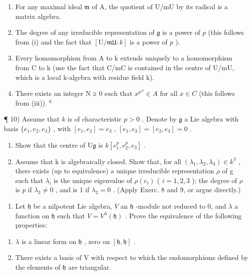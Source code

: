 \begin{enumerate}
\def\labelenumi{(\roman{enumi})}
\item
  For any maximal ideal \(\mathfrak{m}\) of A, the quotient of U/mU by its radical is a matrix algebra.
\item
  The degree of any irreducible representation of \(\mathfrak{g}\) is a power of \(p\) (this follows from (i) and the fact that \([\mathrm{U} / \mathfrak{mU}:k]\) is a power of \(p\) ).
\item
  Every homomorphism from A to k extends uniquely to a homomorphism from C to k (use the fact that C/mC is contained in the centre of U/mU, which is a local k-algebra with residue field k).
\item
  There exists an integer N ≥ 0 such that \(x^{p^{N}} \in A\) for all \(x \in C\) (this follows from (iii)). \(^{6}\)
\end{enumerate}

¶ 10) Assume that \(k\) is of characteristic \(p > 0\) . Denote by \(\mathfrak{g}\) a Lie algebra with basis \(\{e_1, e_2, e_3\}\) , with \([e_1, e_2] = e_3\) , \([e_1, e_3] = [e_2, e_3] = 0\) .

\begin{enumerate}
\def\labelenumi{\alph{enumi})}
\item
  Show that the centre of \(\mathrm{U}\mathfrak{g}\) is \(k[e_1^p,e_2^p,e_3]\) .
\item
  Assume that k is algebraically closed. Show that, for all \((\lambda_{1},\lambda_{2},\lambda_{3})\in k^{3}\) , there exists (up to equivalence) a unique irreducible representation \(\rho\) of g such that \(\lambda_{i}\) is the unique eigenvalue of \(\rho(e_i)\) ( \(i = 1,2,3\) ); the degree of \(\rho\) is \(p\) if \(\lambda_3 \neq 0\) , and is 1 if \(\lambda_3 = 0\) . (Apply Exerc. 8 and 9, or argue directly.)
\end{enumerate}

\begin{enumerate}
\def\labelenumi{\arabic{enumi})}
\setcounter{enumi}{10}
\tightlist
\item
  Let \(\mathfrak{h}\) be a nilpotent Lie algebra, \(V\) an \(\mathfrak{h}\) -module not reduced to 0, and \(\lambda\) a function on \(\mathfrak{h}\) such that \(V = V^{\lambda}(\mathfrak{h})\) . Prove the equivalence of the following properties:
\end{enumerate}

\begin{enumerate}
\def\labelenumi{(\roman{enumi})}
\item
  \(\lambda\) is a linear form on \(\mathfrak{h}\) , zero on \([\mathfrak{h},\mathfrak{h}]\) .
\item
  There exists a basis of \(\mathrm{V}\) with respect to which the endomorphisms defined by the elements of \(\mathfrak{h}\) are triangular.
\end{enumerate}

